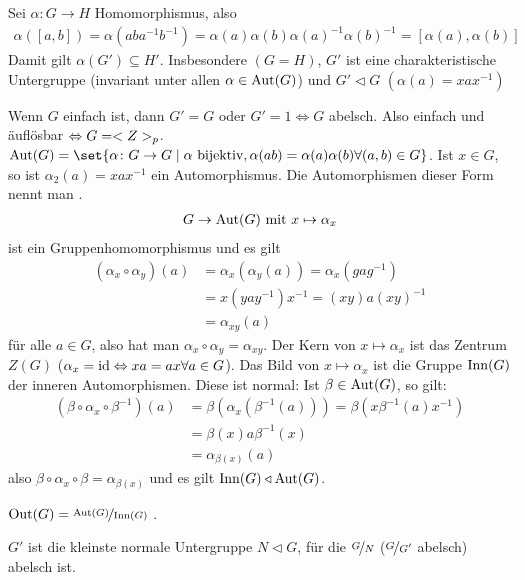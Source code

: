 \begin{*remark}
	Sei $\alpha\colon G \to H$ Homomorphismus, also
	\begin{align*}
		\alpha([a,b]) = \alpha(aba^{-1}b^{-1}) = \alpha(a)\alpha(b)\alpha(a)^{-1}\alpha(b)^{-1} = [\alpha(a),\alpha(b)]
	\end{align*}
	Damit gilt $\alpha(G') \subseteq H'$. Insbesondere $(G=H)$, $G'$ ist eine charakteristische Untergruppe (invariant unter allen $\alpha \in \operatorname{Aut}(G)$) und $G' \lhd G$ $(\alpha(a) = xax^{-1})$
\end{*remark}
\begin{*example}
	Wenn $G$ einfach ist, dann $G' = G$ oder $G' = 1 \Leftrightarrow G$ abelsch. Also einfach und äuflösbar $\Leftrightarrow G = <Z>_p$. $\Aut(G) = \set{\alpha \colon G \to G \mid \alpha \text{ bijektiv}, \alpha(ab) = \alpha(a)\alpha(b)\forall (a,b)\in G}$. Ist $x \in G$, so ist $\alpha_2(a) = x a x^{-1}$ ein Automorphismus. Die Automorphismen dieser Form nennt man .
	\begin{align*}
		G \to \operatorname{Aut}(G) \text{ mit } x \mapsto \alpha_x 
	\end{align*}
	ist ein Gruppenhomomorphismus und es gilt
	\begin{align*}
		(\alpha_x \circ \alpha_y)(a) &= \alpha_x(\alpha_y(a)) = \alpha_x(g a g^{-1})\\
		&= x(yay^{-1})x^{-1} = (xy)a(xy)^{-1}\\
		&= \alpha_{xy}(a)
	\end{align*}
	für alle $a \in G$, also hat man $\alpha_x \circ \alpha_y = \alpha_{xy}$. Der Kern von $x \mapsto \alpha_x$ ist das Zentrum $Z(G)$ ($\alpha_x = \operatorname{id} \Leftrightarrow xa = ax \forall a \in G$). Das Bild von $x \mapsto \alpha_x$ ist die Gruppe $\operatorname{Inn}(G)$ der inneren Automorphismen. Diese ist normal: Ist $\beta \in \operatorname{Aut}(G)$, so gilt:
	\begin{align*}
		(\beta \circ \alpha_x \circ \beta^{-1})(a) &= \beta(\alpha_x(\beta^{-1}(a))) = \beta(x\beta^{-1}(a)x^{-1})\\
		&= \beta(x)a\beta^{-1}(x)\\
		&= \alpha_{\beta(x)}(a)
	\end{align*}
	also $\beta \circ \alpha_x \circ \beta = \alpha_{\beta(x)}$ und es gilt $\operatorname{Inn}(G) \triangleleft \operatorname{Aut}(G)$.
\end{*example}
\begin{definition}
	$\Out(G) = \lnkset{\Aut(G)}{\Inn(G)}$ .
\end{definition}
\begin{proposition}[Klausur!!!]
	$G'$ ist die kleinste normale Untergruppe $N \lhd G$, für die $\lnkset{G}{N}$ ($\lnkset{G}{G'}$ abelsch) abelsch ist.
\end{proposition}
